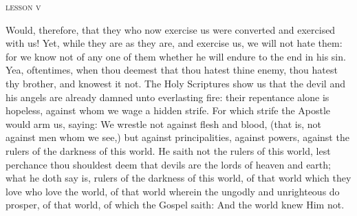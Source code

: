 \pagebreak
{
\begin{center}{\textsc{lesson v}}\end{center}

\begin{parcolumns}[rulebetween,colwidths={1=250pt}]{2}
{Would, therefore, that they who now exercise us were converted and exercised with us! Yet, while they are as they are, and exercise us, we will not hate them: for we know not of any one of them whether he will endure to the end in his sin. Yea, oftentimes, when thou deemest that thou hatest thine enemy, thou hatest thy brother, and knowest it not. The Holy Scriptures show us that the devil and his angels are already damned unto everlasting fire: their repentance alone is hopeless, against whom we wage a hidden strife. For which strife the Apostle would arm us, saying: We wrestle not against flesh and blood, (that is, not against men whom we see,) but against principalities, against powers, against the rulers of the darkness of this world. He saith not the rulers of this world, lest perchance thou shouldest deem that devils are the lords of heaven and earth; what he doth say is, rulers of the darkness of this world, of that world which they love who love the world, of that world wherein the ungodly and unrighteous do prosper, of that world, of which the Gospel saith: And the world knew Him not.}
\end{parcolumns}
}

\bigskip%

